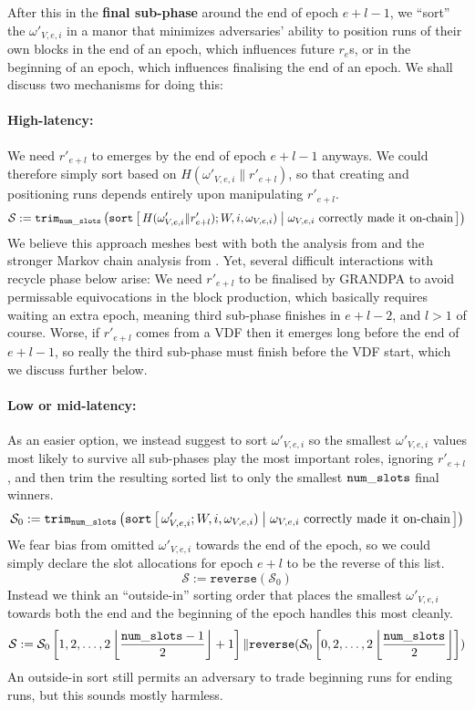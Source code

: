 After this in the {\bf final sub-phase} around the end of epoch $e+l-1$, we ``sort'' the $\omega'_{V,e,i}$ in a manor that minimizes adversaries' ability to position runs of their own blocks in the end of an epoch, which influences future $r_e$s, or in the beginning of an epoch, which influences finalising the end of an epoch.  We shall discuss two mechanisms for doing this: 

\paragraph{High-latency:} 
We need $r'_{e+l}$ to emerges by the end of epoch $e+l-1$ anyways.  We could therefore simply sort based on $H(\omega'_{V,e,i} \| r'_{e+l})$, so that creating and positioning runs depends entirely upon manipulating $r'_{e+l}$. 
$$ \mathcal{S} := \mathtt{trim}_\vrfaslotsbound\left( \mathtt{sort} \Listst{
  H(\omega'_{V,e,i} \| r'_{e+l}); W,i,\omega_{V,e,i}) 
}{
  \omega_{V,e,i} \text{ correctly made it on-chain}
} \right) $$
We believe this approach meshes best with both the analysis from \cite{Praos} and the stronger Markov chain analysis from \cite{Kiffer18}.  Yet, several difficult interactions with recycle phase below arise:  We need $r'_{e+l}$ to be finalised by GRANDPA to avoid permissable equivocations in the block production, which basically requires waiting an extra epoch, meaning third sub-phase finishes in $e+l-2$, and $l>1$ of course.  Worse, if $r'_{e+l}$ comes from a VDF then it emerges long before the end of $e+l-1$, so really the third sub-phase must finish before the VDF start, which we discuss further below.

\paragraph{Low or mid-latency:} 
As an easier option, we instead suggest to sort $\omega'_{V,e,i}$ so the smallest $\omega'_{V,e,i}$ values most likely to survive all sub-phases play the most important roles, ignoring $r'_{e+l}$, and then trim the resulting sorted list to only the smallest $\mathtt{num\_slots}$ final winners. 
$$ 
\mathcal{S}_0 := \mathtt{trim}_\vrfaslotsbound \left( 
\mathtt{sort} \Listst{
  \omega'_{V,e,i}; W,i,\omega_{V,e,i}) 
}{
  \omega_{V,e,i} \text{ correctly made it on-chain} %
} \right) 
$$
We fear bias from omitted $\omega'_{V,e,i}$ towards the end of the epoch, so we could simply declare the slot allocations for epoch $e+l$ to be the reverse of this list.
$$ \mathcal{S} := \mathtt{reverse}( \mathcal{S}_0 )$$
Instead we think an ``outside-in'' sorting order that places the smallest $\omega'_{V,e,i}$ towards both the end and the beginning of the epoch handles this most cleanly.
$$ 
\mathcal{S} := 
  \mathcal{S}_0 \left[ 1,2,\ldots, 2 \left\lfloor {\mathtt{num\_slots}-1 \over 2} \right\rfloor + 1 \right]
\|
  \mathtt{reverse}( \mathcal{S}_0 \left[ 0,2,\ldots, 2 \left\lfloor {\mathtt{num\_slots}\over 2} \right\rfloor \right] )
$$
An outside-in sort still permits an adversary to trade beginning runs for ending runs, but this sounds mostly harmless.

